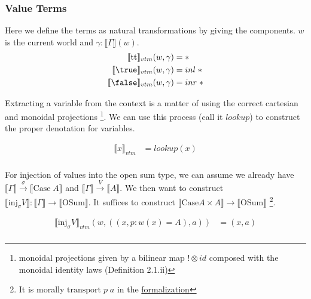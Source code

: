 \documentclass{article}
\newcommand{\den}[1]{\llbracket #1 \rrbracket}
\newcommand{\injj}[2]{\textrm{inj}_{#1}#2}
\newcommand{\ttt}{\textrm{tt}}
\begin{document}
\subsubsection{Value Terms}
Here we define the terms as natural transformations by giving the components. $w$ is the current world and 
$\gamma : \llbracket \Gamma \rrbracket(w)$. 
\begin{align*}
    \llbracket  \ttt \rrbracket_{vtm}(w, \gamma) &= *\\
    \llbracket  \true \rrbracket_{vtm}(w,\gamma) &= inl \;*\\
    \llbracket  \false \rrbracket_{vtm}(w,\gamma) &= inr \;*\\
\end{align*}

Extracting a variable from the context is a matter of using the correct cartesian and monoidal projections
\footnote{monoidal projections given by a bilinear map $! \otimes id$ composed with the monoidal identity laws 
\cite{JACOBS199473}(Definition 2.1.ii)}. We can use this process (call it $lookup$) to construct the proper 
denotation for variables.

\begin{align*}
    \llbracket  x \rrbracket_{vtm} &= lookup(x) \\
\end{align*}

For injection of values into the open sum type, we can assume we already have 
$\den{\Gamma} \xrightarrow{\sigma} \den{\textrm{Case} \; A}$ and $\den{\Gamma} \xrightarrow{V} \den{A}$.
 We then want to construct $\den{\injj{\sigma}{V}} : \den{\Gamma} \rightarrow \den{\textrm{OSum}}$. 
It suffices to construct $\den{\textrm{Case} A \times A} \rightarrow \den{\textrm{OSum}}$
\footnote{It is morally $\textrm{transport} \; p \; a$ in the 
\href{https://github.com/bond15/Bunched-CBPV/blob/a2da10ec10f7bedcce8ded4aea6646b3a184d0b4/src/Models/FuturePast.agda#L264}
{formalization} }.

\begin{align*}
    \llbracket  \injj{\sigma}{V}\rrbracket_{vtm}(w, ((x , p : w(x)=A), a)) &= (x , a )\\
\end{align*}
\end{document}
